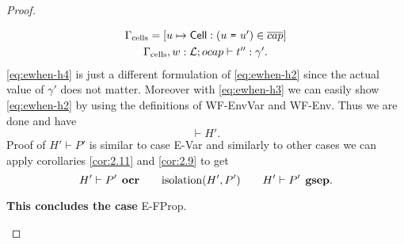 \begin{proof}
\begin{description}
\begin{description}
\begin{description}
\begin{equation}
                \begin{gathered}
                  \Gamma_{\text{cells}} = [u \mapsto \mbox{$\mathsf{Cell}$}: (\mbox{\mdseries$u$~\texttt{=}~$u'$}) \in
                  \overline{cap}] \\
                  \mbox{$\Gamma_{\text{cells}}, w:
                  \mbox{$\mathcal{L}$};\mbox{$ocap$}\vdash t'':\gamma'$}.
                \end{gathered}
              \end{equation}
              \eqref{eq:ewhen-h4} is just a different formulation of
              \eqref{eq:ewhen-h2} since the actual value of $\gamma'$ does not
              matter. Moreover with \eqref{eq:ewhen-h3} we can easily show
              \eqref{eq:ewhen-h2} by using the definitions of {\sc WF-EnvVar}
              and {\sc WF-Env}. Thus we are done and have
              \begin{equation}
                \vdash H'.
              \end{equation}
              Proof of $H' \vdash P'$ is similar to case {\sc E-Var} and
              similarly to other cases we can apply corollaries \ref{cor:2.11}
              and \ref{cor:2.9} to get
              \begin{equation}
                H' \vdash P' \:\: \mbox{\bf ocr} \quad\quad \mbox{$\mathrm{isolation}$}(H', P') \quad\quad H'
                \vdash P' \:\: \mbox{\bf gsep}.
              \end{equation}

              {\bf This concludes the case} {\sc E-FProp}.
          \end{description}


\end{description}
\end{description}
\end{proof}
